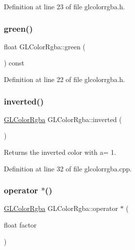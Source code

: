 Definition at line 23 of file glcolorrgba.\+h.

\mbox{\label{class_g_l_color_rgba_a345e39e9aea9ec259b44001e0715d4a7}} 
\subsubsection{\texorpdfstring{green()}{green()}}
{\footnotesize\ttfamily float G\+L\+Color\+Rgba\+::green (\begin{DoxyParamCaption}{ }\end{DoxyParamCaption}) const\hspace{0.3cm}{\ttfamily [inline]}}



Definition at line 22 of file glcolorrgba.\+h.

\mbox{\label{class_g_l_color_rgba_aebd1534aa7987e20cf5bf610a30c812c}} 
\subsubsection{\texorpdfstring{inverted()}{inverted()}}
{\footnotesize\ttfamily \mbox{\hyperlink{class_g_l_color_rgba}{G\+L\+Color\+Rgba}} G\+L\+Color\+Rgba\+::inverted (\begin{DoxyParamCaption}{ }\end{DoxyParamCaption})}

Returns the inverted color with a= 1. 

Definition at line 32 of file glcolorrgba.\+cpp.

\mbox{\label{class_g_l_color_rgba_acc5aee0e35f3165c535416e408170af5}} 
\subsubsection{\texorpdfstring{operator $\ast$()}{operator *()}}
{\footnotesize\ttfamily \mbox{\hyperlink{class_g_l_color_rgba}{G\+L\+Color\+Rgba}} G\+L\+Color\+Rgba\+::operator $\ast$ (\begin{DoxyParamCaption}\item[{float}]{factor }\end{DoxyParamCaption})}



